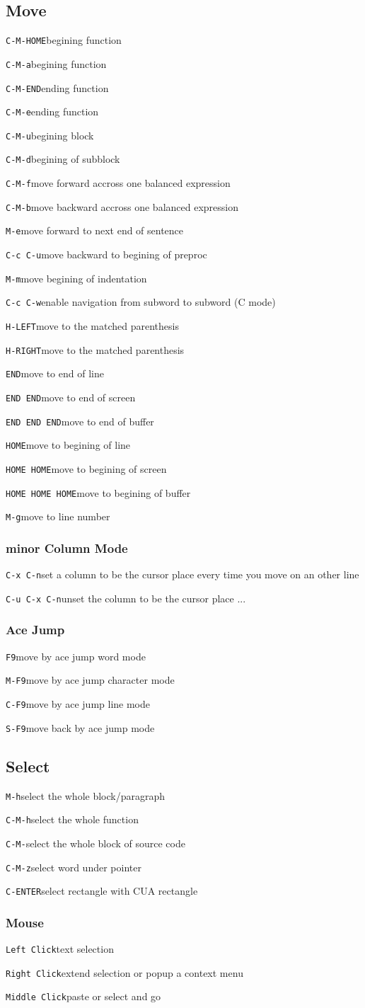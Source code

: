 \documentclass[10pt,landscape]{article}
\def\cm#1#2{{\tt#1}\dotfill#2\par}
\begin{document}
\begin{multicols}{3}
\subsection{Move}
\cm{C-M-HOME}{begining function}
\cm{C-M-a}{begining function}
\cm{C-M-END}{ending function}
\cm{C-M-e}{ending function}
\cm{C-M-u}{begining block}
\cm{C-M-d}{begining of subblock}
\cm{C-M-f}{move forward accross one balanced expression}
\cm{C-M-b}{move backward accross one balanced expression}
\cm{M-e}{move forward to next end of sentence}
\cm{C-c C-u}{move backward to begining of preproc}
\cm{M-m}{move begining of indentation}
\cm{C-c C-w}{enable navigation from subword to subword (C mode)}
\cm{H-LEFT}{move to the matched parenthesis}
\cm{H-RIGHT}{move to the matched parenthesis}
\cm{END}{move to end of line}
\cm{END END}{move to end of screen}
\cm{END END END}{move to end of buffer}
\cm{HOME}{move to begining of line}
\cm{HOME HOME}{move to begining of screen}
\cm{HOME HOME HOME}{move to begining of buffer}
\cm{M-g}{move to line number}

\subsubsection{minor Column Mode}
\cm{C-x C-n}{set a column to be the cursor place every time you move on an other line}
\cm{C-u C-x C-n}{unset the column to be the cursor place ...}

\subsubsection{Ace Jump}
\cm{F9}{move by ace jump word mode}
\cm{M-F9}{move by ace jump character mode}
\cm{C-F9}{move by ace jump line mode}
\cm{S-F9}{move back by ace jump mode}

\subsection{Select}
\cm{M-h}{select the whole block/paragraph}
\cm{C-M-h}{select the whole function}
\cm{C-M-\@}{select the whole block of source code}
\cm{C-M-z}{select word under pointer}
\cm{C-ENTER}{select rectangle with CUA rectangle}

\subsubsection{Mouse}
\cm{Left Click}{text selection}
\cm{Right Click}{extend selection or popup a context menu}
\cm{Middle Click}{paste or select and go}


\end{multicols}
\end{document}
